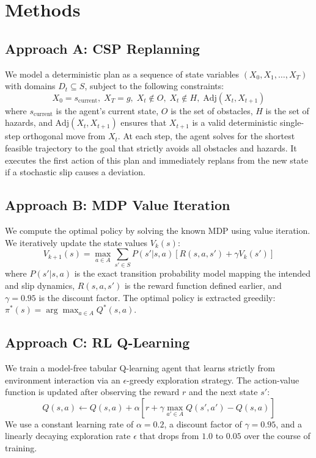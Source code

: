 \documentclass[letterpaper]{article} %
\begin{document}
\section{Methods}
\subsection{Approach A: CSP Replanning}
We model a deterministic plan as a sequence of state variables $(X_0, X_1, \dots, X_T)$ with domains $D_t \subseteq S$, subject to the following constraints:
\begin{equation}
X_0=s_{\text{current}},\; X_T=g,\; X_t \notin O,\; X_t \notin H,\; \text{Adj}(X_t, X_{t+1})
\end{equation}
where $s_{\text{current}}$ is the agent's current state, $O$ is the set of obstacles, $H$ is the set of hazards, and $\text{Adj}(X_t, X_{t+1})$ ensures that $X_{t+1}$ is a valid deterministic single-step orthogonal move from $X_t$. At each step, the agent solves for the shortest feasible trajectory to the goal that strictly avoids all obstacles and hazards. It executes the first action of this plan and immediately replans from the new state if a stochastic slip causes a deviation.

\subsection{Approach B: MDP Value Iteration}
We compute the optimal policy by solving the known MDP using value iteration. We iteratively update the state values $V_k(s)$:
\begin{equation}
V_{k+1}(s)=\max_{a\in A}\sum_{s'\in S} P(s'|s,a)\left[R(s,a,s')+\gamma V_k(s')\right]
\end{equation}
where $P(s'|s,a)$ is the exact transition probability model mapping the intended and slip dynamics, $R(s,a,s')$ is the reward function defined earlier, and $\gamma=0.95$ is the discount factor. The optimal policy is extracted greedily: $\pi^*(s)=\arg\max_{a\in A} Q^*(s,a)$.

\subsection{Approach C: RL Q-Learning}
We train a model-free tabular Q-learning agent that learns strictly from environment interaction via an $\epsilon$-greedy exploration strategy. The action-value function is updated after observing the reward $r$ and the next state $s'$:
\begin{equation}
Q(s,a) \leftarrow Q(s,a)+\alpha\left[r+\gamma\max_{a'\in A}Q(s',a')-Q(s,a)\right]
\end{equation}
We use a constant learning rate of $\alpha=0.2$, a discount factor of $\gamma=0.95$, and a linearly decaying exploration rate $\epsilon$ that drops from $1.0$ to $0.05$ over the course of training.
\end{document}
